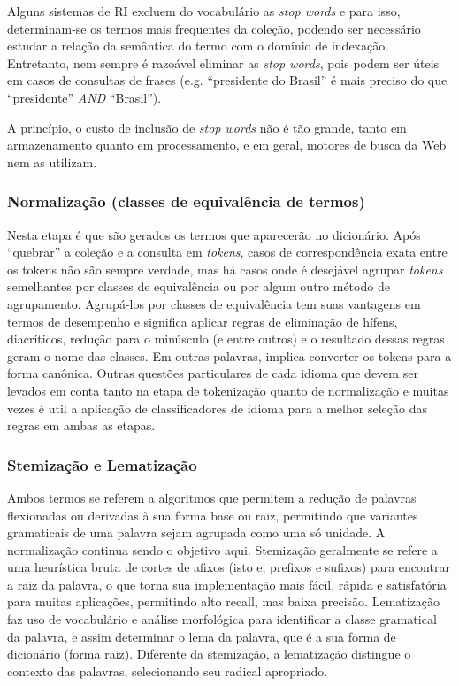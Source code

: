Alguns sistemas de RI excluem do vocabulário as \emph{stop words} e para isso, determinam-se os termos mais frequentes da coleção, podendo ser necessário estudar a relação da semântica do termo com o domínio de indexação. Entretanto, nem sempre é razoável eliminar as \emph{stop words}, pois podem ser úteis em casos de consultas de frases (e.g. ``presidente do Brasil'' é mais preciso do que ``presidente'' \emph{AND} ``Brasil'').

A princípio, o custo de inclusão de \emph{stop words} não é tão grande, tanto em armazenamento quanto em processamento, e em geral, motores de busca da Web nem as utilizam.

\subsubsection{Normalização (classes de equivalência de termos)}

Nesta etapa é que são gerados os termos que aparecerão no dicionário. Após ``quebrar'' a coleção e a consulta em \emph{tokens}, casos de correspondência exata entre os tokens não são sempre verdade, mas há casos onde é desejável agrupar \emph{tokens} semelhantes por classes de equivalência ou por algum outro método de agrupamento. Agrupá-los por classes de equivalência tem suas vantagens em termos de desempenho e significa aplicar regras de eliminação de hífens, diacríticos, redução para o minúsculo (e entre outros) e o resultado dessas regras geram o nome das classes. Em outras palavras, implica converter os tokens para a forma canônica. Outras questões particulares de cada idioma que devem ser levados em conta tanto na etapa de tokenização quanto de normalização e muitas vezes é util a aplicação de classificadores de idioma para a melhor seleção das regras em ambas as etapas.

\subsubsection{Stemização e Lematização}

Ambos termos se referem a algoritmos que permitem a redução de palavras flexionadas ou derivadas à sua forma base ou raiz, permitindo que variantes gramaticais de uma palavra sejam agrupada como uma só unidade. A normalização continua sendo o objetivo aqui.
Stemização geralmente se refere a uma heurística bruta de cortes de afixos (isto e, prefixos e sufixos) para encontrar a raiz da palavra, o que torna sua implementação mais fácil, rápida e satisfatória para muitas aplicações, permitindo alto recall, mas baixa precisão.
Lematização faz uso de vocabulário e análise morfológica para identificar a classe gramatical da palavra, e assim determinar o lema da palavra, que é a sua forma de dicionário (forma raiz). Diferente da stemização, a lematização distingue o contexto das palavras, selecionando seu radical apropriado.

